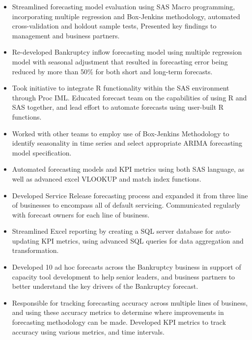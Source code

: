 \documentclass[a4paper,10pt]{article}
\begin{document}
\begin{itemize}
\item Streamlined forecasting model evaluation using SAS Macro programming, incorporating multiple regression and Box-Jenkins methodology, automated cross-validation and holdout sample tests, Presented key findings to management and business partners.
\item Re-developed Bankruptcy inflow forecasting model using multiple regression model with seasonal adjustment that resulted in forecasting error being reduced by more than 50\% for both short and long-term forecasts. 
\item Took initiative to integrate R functionality within the SAS environment through Proc IML.  Educated forecast team on the capabilities of using R and SAS together, and lead effort to automate forecasts using user-built R functions.
\item Worked with other teams to employ use of Box-Jenkins Methodology to identify seasonality in time series and select appropriate ARIMA forecasting model specification.
\item Automated forecasting models and KPI metrics using both SAS language, as well as advanced excel VLOOKUP and match index functions.
\item Developed Service Release forecasting process and expanded it from three line of businesses to encompass all of default servicing.  Communicated regularly with forecast owners for each line of business.
\item Streamlined Excel reporting by creating a SQL server database for auto-updating KPI metrics, using advanced SQL queries for data aggregation and transformation.
\item Developed 10 ad hoc forecasts across the Bankruptcy business in support of capacity tool development to help senior leaders, and business partners to better understand the key drivers of the Bankruptcy forecast.
\item Responsible for tracking forecasting accuracy across multiple lines of business, and using these accuracy metrics to determine where improvements in forecasting methodology can be made. Developed KPI metrics to track accuracy using various metrics, and time intervals. 
\end{itemize}
\end{document}
